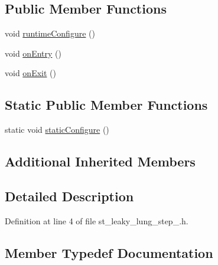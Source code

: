 \subsection*{Public Member Functions}
\begin{DoxyCompactItemize}
\item 
void \hyperlink{structsm__respira__1_1_1StLeakyLungStep1_a719c4ddb79e1709beb87e4e124104723}{runtime\+Configure} ()
\item 
void \hyperlink{structsm__respira__1_1_1StLeakyLungStep1_aacb7c33d583b637b4f10164bad7e703c}{on\+Entry} ()
\item 
void \hyperlink{structsm__respira__1_1_1StLeakyLungStep1_a240d20f059cbc41d8b85bf0ac699f1d1}{on\+Exit} ()
\end{DoxyCompactItemize}
\subsection*{Static Public Member Functions}
\begin{DoxyCompactItemize}
\item 
static void \hyperlink{structsm__respira__1_1_1StLeakyLungStep1_ad6db77c4cd9b311e2e34c0d3fef17580}{static\+Configure} ()
\end{DoxyCompactItemize}
\subsection*{Additional Inherited Members}


\subsection{Detailed Description}


Definition at line 4 of file st\+\_\+leaky\+\_\+lung\+\_\+step\+\_.\+h.



\subsection{Member Typedef Documentation}
\mbox{\label{structsm__respira__1_1_1StLeakyLungStep1_a7db4fb4dc25a1c7b41ed9b364445ddec}} 
